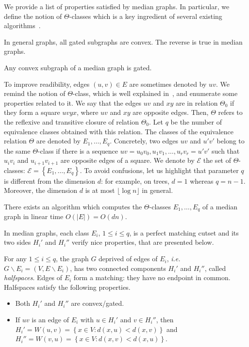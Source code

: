 \documentclass[a4paper,UKenglish,numberwithinsect,cleveref, autoref]{lipics-v2021}
\newcommand{\set}[1]{\left\{ #1 \right\}}
\newcommand{\card}[1]{\left| #1 \right|}
\begin{document}
We provide a list of properties satisfied by median graphs. In particular, we define the notion of $\Theta$-classes which is a key ingredient of several existing algorithms~\cite{BeChChVa20,HaImKl99,ImKlMu99}.

In general graphs, all gated subgraphs are convex. The reverse is true in median graphs.
\begin{lemma}
Any convex subgraph of a median graph is gated.
\end{lemma}

To improve readibility, edges $(u,v) \in E$ are sometimes denoted by $uv$. We remind the notion of $\Theta$-class, which is well explained in~\cite{BeChChVa20}, and enumerate some properties related to it. We say that the edges $uv$ and $xy$ are in relation $\Theta_0$ if they form a square $uvyx$, where $uv$ and $xy$ are opposite edges. Then, $\Theta$ refers to the reflexive and transitive closure of relation $\Theta_0$. Let $q$ be the number of equivalence classes obtained with this relation. The classes of the equivalence relation $\Theta$ are denoted by $E_1,\ldots,E_q$. Concretely, two edges $uv$ and $u'v'$ belong to the same $\Theta$-class if there is a sequence $uv = u_0v_0, u_1v_1, \ldots, u_rv_r= u'v'$ such that $u_iv_i$ and $u_{i+1}v_{i+1}$ are opposite edges of a square. We denote by $\mathcal{E}$ the set of $\Theta$-classes: $\mathcal{E} = \set{E_1,\ldots,E_q}$. To avoid confusions, let us highlight that parameter $q$ is different from the dimension $d$: for example, on trees, $d=1$ whereas $q = n-1$. Moreover, the dimension $d$ is at most $\lfloor \log n \rfloor$ in general.

\begin{lemma}
There exists an algorithm which computes the $\Theta$-classes $E_1,\ldots,E_q$ of a median graph in linear time $O(\card{E}) = O(dn)$.
\label{le:linear_classes}
\end{lemma}

In median graphs, each class $E_i$, $1\le i\le q$, is a perfect matching cutset and its two sides $H_i'$ and $H_i''$ verify nice properties, that are presented below.

\begin{lemma}
For any $1\le i\le q$, the graph $G$ deprived of edges of $E_i$, {\em i.e.} $G\backslash E_i = (V,E\backslash E_i)$, has two connected components $H_i'$ and $H_i''$, called \textit{halfspaces}. Edges of $E_i$ form a matching: they have no endpoint in common. Halfspaces satisfy the following properties.
\begin{itemize}
\item Both $H_i'$ and $H_i''$ are convex/gated.
\item If $uv$ is an edge of $E_i$ with $u \in H_i'$ and $v \in H_i''$, then $H_i' = W(u,v) = \set{x \in V: d(x,u) < d(x,v)}$ and $H_i'' = W(v,u) = \set{x \in V: d(x,v) < d(x,u)}$.
\end{itemize}
\label{le:halfspaces}
\end{lemma}
\end{document}
